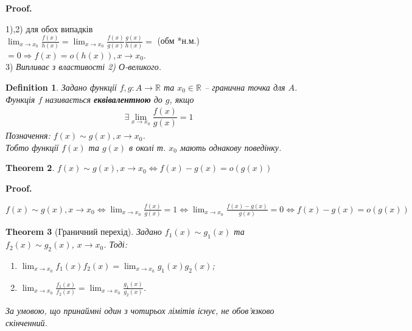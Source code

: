 \documentclass[a4paper, 14pt]{article}
\makeatletter
\def\qed{$\blacksquare$}
\theoremstyle{theoremdd}
\newtheorem{theorem}{Theorem}[subsection]
\theoremstyle{theoremdd}
\newtheorem{definition}[theorem]{Definition}
\theoremstyle{theoremdd}
\theoremstyle{theoremdd}
\theoremstyle{theoremdd}
\theoremstyle{theoremdd}
\theoremstyle{theoremdd}
\theoremstyle{theoremdd}
\renewenvironment{proof}[1][Proof.\\]{\par
\pushQED{\hfill \qed}%
\normalfont \topsep6\p@\@plus6\p@\relax
\trivlist
\item\relax
{\bfseries
#1\@addpunct{.}}\hspace\labelsep\ignorespaces
}{%
\popQED\endtrivlist\@endpefalse
}
\makeatother
\begin{document}
\begin{proof}
1),2) для обох випадків\\
$\displaystyle \lim_{x \to x_0} \frac{f(x)}{h(x)} = \lim_{x \to x_0} \frac{f(x)}{g(x)} \frac{g(x)}{h(x)} =$ (обм *н.м.) $= 0 \Rightarrow f(x) = o(h(x)), x \to x_0$.
\bigskip \\
3) \textit{Випливає з властивості 2) О-великого.}
\end{proof}

\begin{definition}
Задано функції $f,g \colon A \to \mathbb{R}$ та $x_0 \in \mathbb{R}$ -- гранична точка для $A$.\\
Функція $f$ називається \textbf{еквівалентною} до $g$, якщо
\begin{align*}
\exists \displaystyle\lim_{x \to x_0} \dfrac{f(x)}{g(x)} = 1
\end{align*}
Позначення: $f(x) \sim g(x), x \to x_0$.\\
Тобто функції $f(x)$ та $g(x)$ в околі т. $x_0$ мають однакову поведінку.
\end{definition}

\begin{theorem}
$f(x) \sim g(x), x \to x_0 \iff f(x)-g(x) = o(g(x))$
\end{theorem}

\begin{proof}
$f(x) \sim g(x), x \to x_0 \iff \displaystyle \lim_{x \to x_0} \frac{f(x)}{g(x)} = 1 \iff \lim_{x \to x_0} \frac{f(x)-g(x)}{g(x)} = 0 \iff f(x)-g(x) = o(g(x))$
\end{proof}

\begin{theorem}[Граничний перехід]
Задано $f_1(x) \sim g_1(x)$ та $f_2(x) \sim g_2(x)$, $x \to x_0$. Тоді:
\begin{enumerate}[nosep,wide=0pt,label={\arabic*)}]
\item $\displaystyle \lim_{x \to x_0} f_1(x) f_2(x) = \lim_{x \to x_0} g_1(x) g_2(x)$;\\
\item $\displaystyle \lim_{x \to x_0} \frac{f_1(x)}{f_2(x)} = \lim_{x \to x_0} \frac{g_1(x)}{g_2(x)}$.
\end{enumerate}
За умовою, що принаймні один з чотирьох лімітів існує, не обов'язково скінченний.
\end{theorem}
\end{document}
